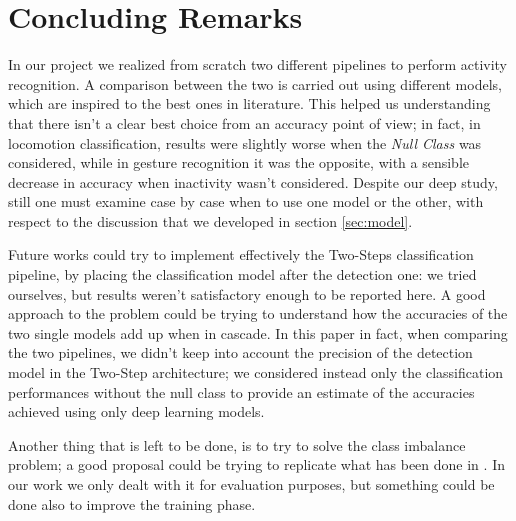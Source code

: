 
\section{Concluding Remarks}
\label{sec:conclusions}

In our project we realized from scratch two different pipelines to perform activity recognition. A comparison between the two is carried out using different models, which are inspired to the best ones in literature. This helped us understanding that there isn’t a clear best choice from an accuracy point of view; in fact, in locomotion classification, results were slightly worse when the \textit{Null Class} was considered, while in gesture recognition it was the opposite, with a sensible decrease in accuracy when inactivity wasn’t considered. Despite our deep study, still one must examine case by case when to use one model or the other, with respect to the discussion that we developed in section \ref{sec:model}.

Future works could try to implement effectively the Two-Steps classification pipeline, by placing the classification model after the detection one: we tried ourselves, but results weren’t satisfactory enough to be reported here. A good approach to the problem could be trying to understand how the accuracies of the two single models add up when in cascade. In this paper in fact, when comparing the two pipelines, we didn’t keep into account the precision of the detection model in the Two-Step architecture; we considered instead only the classification performances without the null class to provide an estimate of the accuracies achieved using only deep learning models. 

Another thing that is left to be done, is to try to solve the class imbalance problem; a good proposal could be trying to replicate what has been done in \cite{japkowicz2002class}. In our work we only dealt with it for evaluation purposes, but something could be done also to improve the training phase.
